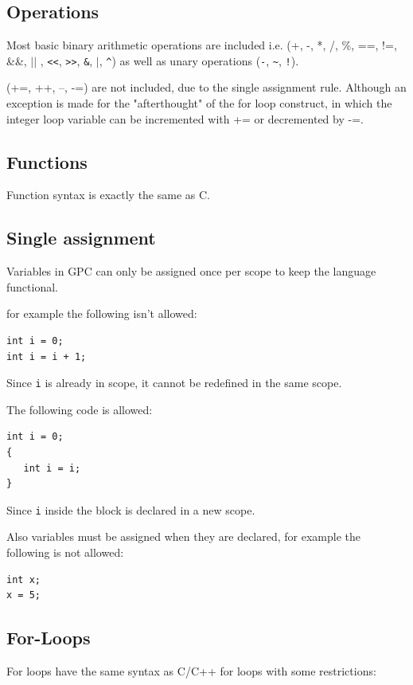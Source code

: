 \subsection{Operations}
        Most basic binary arithmetic operations are included i.e. 
        (+, -, *, /, \%, ==, !=, \&\&, $||$ , \lstinline|<<|, \lstinline|>>|, \lstinline|&|, $|$, 
        \lstinline|^|) as well as
        unary operations 
        (\lstinline|-|, \lstinline|~|, \lstinline|!|).

        (+=, ++, --, -=) are not included, due to the single assignment rule.
        Although an exception is made for the "afterthought" of the for loop construct, in which
        the integer loop variable can be incremented with += or decremented by -=.

\subsection{Functions}
        Function syntax is exactly the same as C. 


\subsection{Single assignment}
Variables in GPC can only be assigned once per scope to keep
the language functional.

for example the following isn't allowed:

\begin{lstlisting}[style=myGPC]
int i = 0;
int i = i + 1;
\end{lstlisting}

Since \texttt{i} is already in scope, it cannot be redefined in the same scope.

The following code is allowed:

\begin{lstlisting}[style=myGPC]
int i = 0;
{
   int i = i;
}
\end{lstlisting}

Since \texttt{i} inside the block is declared in a new scope.

Also variables must be assigned when they are declared, for example the following is not allowed:

\begin{lstlisting}[style=myGPC]
int x;
x = 5;
\end{lstlisting}

\subsection{For-Loops}
For loops have the same syntax as C/C++ for loops with some restrictions:

